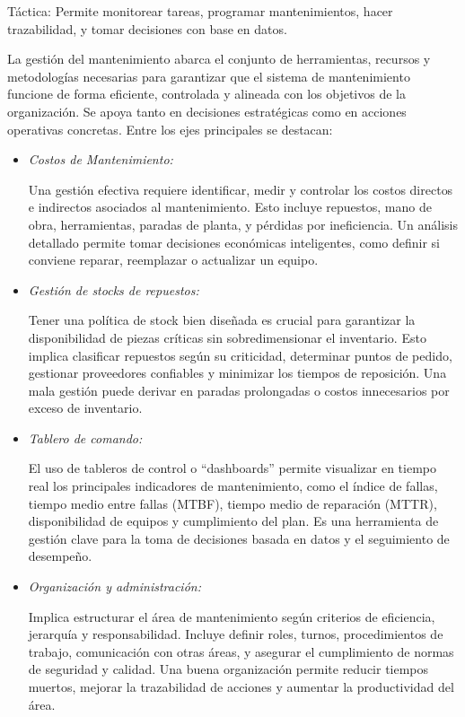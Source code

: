 \documentclass[a4paper,oneside,11pt]{article}
\begin{document}
\begin{enumerate}
    Táctica: Permite monitorear tareas, programar mantenimientos, hacer trazabilidad, y tomar decisiones con base en datos.

    La gestión del mantenimiento abarca el conjunto de herramientas, recursos y metodologías necesarias para garantizar que el sistema de mantenimiento funcione de forma eficiente, controlada y alineada con los objetivos de la organización. Se apoya tanto en decisiones estratégicas como en acciones operativas concretas. Entre los ejes principales se destacan:

    \begin{itemize}
        \item \textit{Costos de Mantenimiento:}
        
        Una gestión efectiva requiere identificar, medir y controlar los costos directos e indirectos asociados al mantenimiento. Esto incluye repuestos, mano de obra, herramientas, paradas de planta, y pérdidas por ineficiencia. Un análisis detallado permite tomar decisiones económicas inteligentes, como definir si conviene reparar, reemplazar o actualizar un equipo.

        \item \textit{Gestión de stocks de repuestos:}

        Tener una política de stock bien diseñada es crucial para garantizar la disponibilidad de piezas críticas sin sobredimensionar el inventario. Esto implica clasificar repuestos según su criticidad, determinar puntos de pedido, gestionar proveedores confiables y minimizar los tiempos de reposición. Una mala gestión puede derivar en paradas prolongadas o costos innecesarios por exceso de inventario.

        \item \textit{Tablero de comando:}

        El uso de tableros de control o “dashboards” permite visualizar en tiempo real los principales indicadores de mantenimiento, como el índice de fallas, tiempo medio entre fallas (MTBF), tiempo medio de reparación (MTTR), disponibilidad de equipos y cumplimiento del plan. Es una herramienta de gestión clave para la toma de decisiones basada en datos y el seguimiento de desempeño.

        \item \textit{Organización y administración:}

        Implica estructurar el área de mantenimiento según criterios de eficiencia, jerarquía y responsabilidad. Incluye definir roles, turnos, procedimientos de trabajo, comunicación con otras áreas, y asegurar el cumplimiento de normas de seguridad y calidad. Una buena organización permite reducir tiempos muertos, mejorar la trazabilidad de acciones y aumentar la productividad del área.


\end{itemize}
\end{enumerate}
\end{document}
